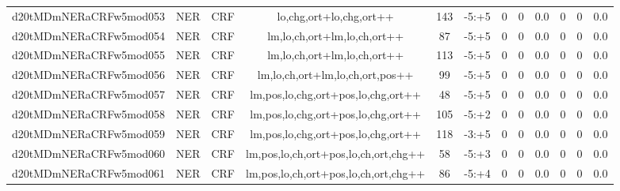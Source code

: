 \documentclass[a4paper]{article}
\begin{document}
\begin{landscape}
\begin{center}
\begin{tabular}{ |c|c|c|c|c|c|c|c|c|c|c|c|}
 
 	
 	\small{ d20tMDmNERaCRFw5mod053 } & \small{ NER} & \small{  CRF }  & lo,chg,ort+lo,chg,ort++  &  143 &  \small{  -5:+5 }  &  0 & 0 & 0.0  &  0 & 0 & 0.0 \\
 	

 
 	
 	\small{ d20tMDmNERaCRFw5mod054 } & \small{ NER} & \small{  CRF }  & lm,lo,ch,ort+lm,lo,ch,ort++  &  87 &  \small{  -5:+5 }  &  0 & 0 & 0.0  &  0 & 0 & 0.0 \\
 	

 
 	
 	\small{ d20tMDmNERaCRFw5mod055 } & \small{ NER} & \small{  CRF }  & lm,lo,ch,ort+lm,lo,ch,ort++  &  113 &  \small{  -5:+5 }  &  0 & 0 & 0.0  &  0 & 0 & 0.0 \\
 	

 
 	
 	\small{ d20tMDmNERaCRFw5mod056 } & \small{ NER} & \small{  CRF }  & lm,lo,ch,ort+lm,lo,ch,ort,pos++  &  99 &  \small{  -5:+5 }  &  0 & 0 & 0.0  &  0 & 0 & 0.0 \\
 	

 
 	
 	\small{ d20tMDmNERaCRFw5mod057 } & \small{ NER} & \small{  CRF }  & lm,pos,lo,chg,ort+pos,lo,chg,ort++  &  48 &  \small{  -5:+5 }  &  0 & 0 & 0.0  &  0 & 0 & 0.0 \\
 	

 
 	
 	\small{ d20tMDmNERaCRFw5mod058 } & \small{ NER} & \small{  CRF }  & lm,pos,lo,chg,ort+pos,lo,chg,ort++  &  105 &  \small{  -5:+2 }  &  0 & 0 & 0.0  &  0 & 0 & 0.0 \\
 	

 
 	
 	\small{ d20tMDmNERaCRFw5mod059 } & \small{ NER} & \small{  CRF }  & lm,pos,lo,chg,ort+pos,lo,chg,ort++  &  118 &  \small{  -3:+5 }  &  0 & 0 & 0.0  &  0 & 0 & 0.0 \\
 	

 
 	
 	\small{ d20tMDmNERaCRFw5mod060 } & \small{ NER} & \small{  CRF }  & lm,pos,lo,ch,ort+pos,lo,ch,ort,chg++  &  58 &  \small{  -5:+3 }  &  0 & 0 & 0.0  &  0 & 0 & 0.0 \\
 	

 
 	
 	\small{ d20tMDmNERaCRFw5mod061 } & \small{ NER} & \small{  CRF }  & lm,pos,lo,ch,ort+pos,lo,ch,ort,chg++  &  86 &  \small{  -5:+4 }  &  0 & 0 & 0.0  &  0 & 0 & 0.0 \\
 	


\end{tabular}
\end{center}
\end{landscape}
\end{document}
